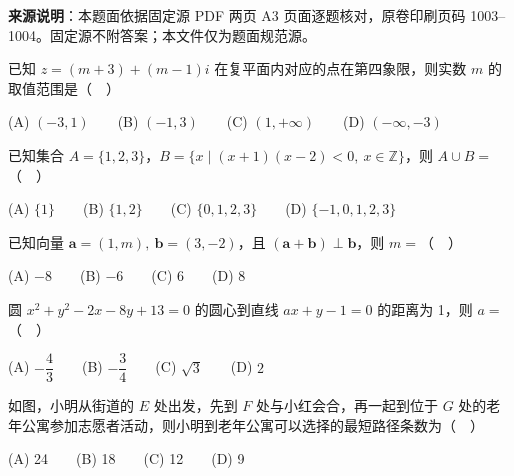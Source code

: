 


\begin{gktip}
\textbf{来源说明}：本题面依据固定源 PDF 两页 A3 页面逐题核对，原卷印刷页码 1003–1004。固定源不附答案；本文件仅为题面规范源。
\end{gktip}


\begin{question}
已知 \(z=(m+3)+(m-1)i\) 在复平面内对应的点在第四象限，则实数 \(m\) 的取值范围是（　）

   (A) \((-3,1)\)　　(B) \((-1,3)\)　　(C) \((1,+\infty)\)　　(D) \((-\infty,-3)\)

\end{question}
\begin{question}
已知集合 \(A=\{1,2,3\}\)，\(B=\{x\mid(x+1)(x-2)<0,\ x\in\mathbb Z\}\)，则 \(A\cup B=\)（　）

   (A) \(\{1\}\)　　(B) \(\{1,2\}\)　　(C) \(\{0,1,2,3\}\)　　(D) \(\{-1,0,1,2,3\}\)

\end{question}
\begin{question}
已知向量 \(\boldsymbol a=(1,m),\ \boldsymbol b=(3,-2)\)，且 \((\boldsymbol a+\boldsymbol b)\perp\boldsymbol b\)，则 \(m=\)（　）

   (A) \(-8\)　　(B) \(-6\)　　(C) \(6\)　　(D) \(8\)

\end{question}
\begin{question}
圆 \(x^2+y^2-2x-8y+13=0\) 的圆心到直线 \(ax+y-1=0\) 的距离为 1，则 \(a=\)（　）

   (A) \(-\dfrac43\)　　(B) \(-\dfrac34\)　　(C) \(\sqrt3\)　　(D) \(2\)

\Needspace{0.4\textheight}
\end{question}
\begin{question}
如图，小明从街道的 \(E\) 处出发，先到 \(F\) 处与小红会合，再一起到位于 \(G\) 处的老年公寓参加志愿者活动，则小明到老年公寓可以选择的最短路径条数为（　）
\nopagebreak[4]
\begin{center}\end{center}
\nopagebreak[4]
   (A) 24　　(B) 18　　(C) 12　　(D) 9

\Needspace{0.4\textheight}
\end{question}
